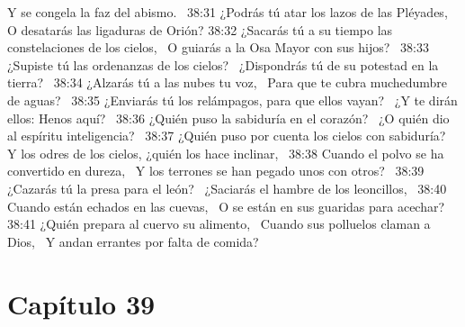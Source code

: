 Y se congela la faz del abismo.  
38:31 ¿Podrás tú atar los lazos de las Pléyades,  
O desatarás las ligaduras de Orión? 
38:32 ¿Sacarás tú a su tiempo las constelaciones de los cielos,  
O guiarás a la Osa Mayor con sus hijos?  
38:33 ¿Supiste tú las ordenanzas de los cielos?  
¿Dispondrás tú de su potestad en la tierra?  
38:34 ¿Alzarás tú a las nubes tu voz,  
Para que te cubra muchedumbre de aguas?  
38:35 ¿Enviarás tú los relámpagos, para que ellos vayan?  
¿Y te dirán ellos: Henos aquí?  
38:36 ¿Quién puso la sabiduría en el corazón?  
¿O quién dio al espíritu inteligencia?  
38:37 ¿Quién puso por cuenta los cielos con sabiduría?  
Y los odres de los cielos, ¿quién los hace inclinar,  
38:38 Cuando el polvo se ha convertido en dureza,  
Y los terrones se han pegado unos con otros?  
38:39 ¿Cazarás tú la presa para el león?  
¿Saciarás el hambre de los leoncillos,  
38:40 Cuando están echados en las cuevas,  
O se están en sus guaridas para acechar?  
38:41 ¿Quién prepara al cuervo su alimento,  
Cuando sus polluelos claman a Dios,  
Y andan errantes por falta de comida?  
\section*{Capítulo 39 }

